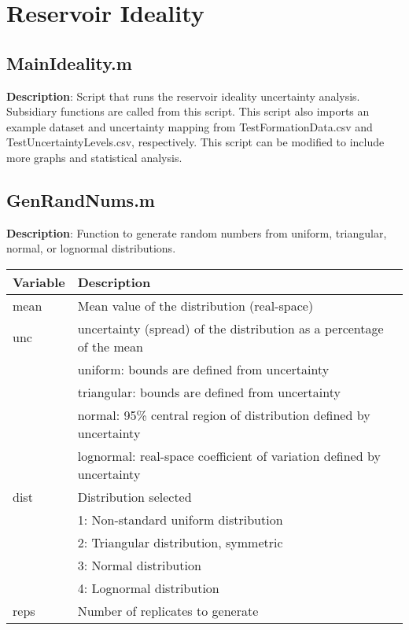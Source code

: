 \documentclass[12pt,a4paper]{article}
\begin{document}
\section*{Reservoir Ideality}

\subsection*{\textsf{MainIdeality.m}}

\textbf{Description}: Script that runs the reservoir ideality uncertainty analysis. Subsidiary functions are called from this script. This script also imports an example dataset and uncertainty mapping from \textsf{TestFormationData.csv} and \textsf{TestUncertaintyLevels.csv}, respectively. This script can be modified to include more graphs and statistical analysis.

\subsection*{\textsf{GenRandNums.m}}

\textbf{Description}: Function to generate random numbers from uniform, triangular, normal, or lognormal distributions.

\begin{table}[H]
\begin{tabular} {p{2cm} p{11cm}}
\hline
\textbf{Variable} & \textbf{Description}\\
\hline
\textsf{mean} 			 & Mean value of the distribution (real-space)\\
\textsf{unc} & uncertainty (spread) of the distribution as a percentage of the mean\\
 & uniform: bounds are defined from uncertainty\\
 & triangular: bounds are defined from uncertainty\\
 & normal: 95\% central region of distribution defined by uncertainty\\
 & lognormal: real-space coefficient of variation  defined by uncertainty\\
\textsf{dist} & Distribution selected\\
 & 1: Non-standard uniform distribution\\
 & 2: Triangular distribution, symmetric\\
 & 3: Normal distribution\\
 & 4: Lognormal distribution\\
\textsf{reps} & Number of replicates to generate\\
\hline
\end{tabular} 
\end{table}
\end{document}
